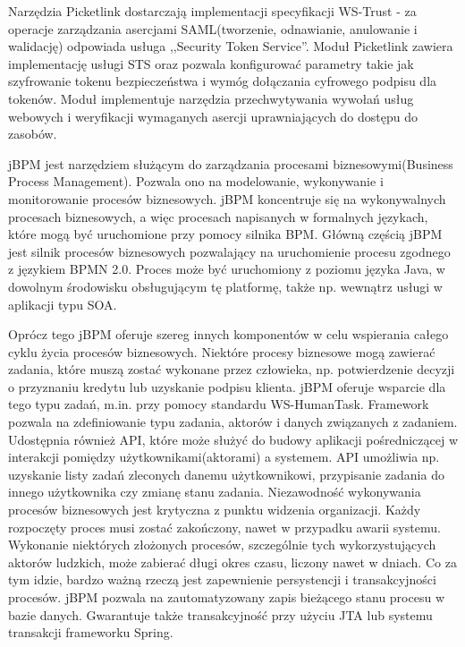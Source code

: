 Narzędzia Picketlink dostarczają implementacji specyfikacji WS-Trust - za operacje zarządzania asercjami SAML(tworzenie, odnawianie, anulowanie i walidację) odpowiada usługa ,,Security Token Service''. Moduł Picketlink zawiera implementację usługi STS oraz pozwala konfigurować parametry takie jak szyfrowanie tokenu bezpieczeństwa i wymóg dołączania cyfrowego podpisu dla tokenów. Moduł implementuje narzędzia przechwytywania wywołań usług webowych i weryfikacji wymaganych asercji uprawniających do dostępu do zasobów. 


\label{sec:bpm}

jBPM jest narzędziem służącym do zarządzania procesami biznesowymi(Business Process Management). Pozwala ono na modelowanie, wykonywanie i monitorowanie procesów biznesowych. jBPM koncentruje się na wykonywalnych procesach biznesowych, a więc procesach napisanych w formalnych językach, które mogą być uruchomione przy pomocy silnika BPM.
Główną częścią jBPM jest silnik procesów biznesowych pozwalający na uruchomienie procesu zgodnego z językiem BPMN 2.0. Proces może być uruchomiony z poziomu języka Java, w dowolnym środowisku obsługującym tę platformę, także np. wewnątrz usługi w aplikacji typu SOA. 

Oprócz tego jBPM oferuje szereg innych komponentów w celu wspierania całego cyklu życia procesów biznesowych. Niektóre procesy biznesowe mogą zawierać zadania, które muszą zostać wykonane przez człowieka, np. potwierdzenie decyzji o przyznaniu kredytu lub uzyskanie podpisu klienta. jBPM oferuje wsparcie dla tego typu zadań, m.in. przy pomocy standardu WS-HumanTask. Framework pozwala na zdefiniowanie typu zadania, aktorów i danych związanych z zadaniem. Udostępnia również API, które może służyć do budowy aplikacji pośredniczącej w interakcji pomiędzy użytkownikami(aktorami) a systemem. API umożliwia np.  uzyskanie listy zadań zleconych danemu użytkownikowi, przypisanie zadania do innego użytkownika czy zmianę stanu zadania.
Niezawodność wykonywania procesów biznesowych jest krytyczna z punktu widzenia organizacji. Każdy rozpoczęty proces musi zostać zakończony, nawet w przypadku awarii systemu. Wykonanie niektórych złożonych procesów, szczególnie tych wykorzystujących aktorów ludzkich,  może zabierać długi okres czasu, liczony nawet w dniach. Co za tym idzie, bardzo ważną rzeczą jest zapewnienie persystencji i transakcyjności procesów. jBPM pozwala na zautomatyzowany zapis bieżącego stanu procesu w bazie danych. Gwarantuje także transakcyjność przy użyciu JTA lub systemu transakcji frameworku Spring.

